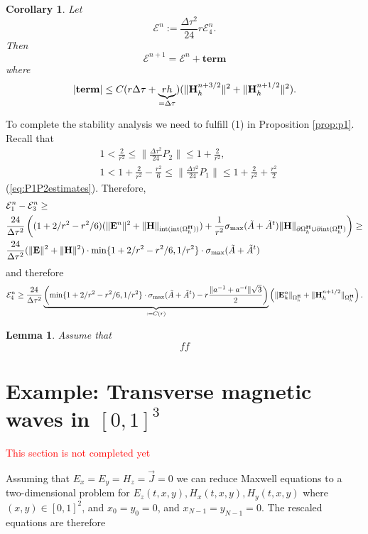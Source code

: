 \documentclass[12pt,reqno]{amsart}
\newcommand{\e}{{\bf E}}
\newcommand{\h}{{\bf H}}
\newtheorem{cor}[theorem]{Corollary}
\newtheorem{lem}[theorem]{Lemma}
\theoremstyle{definition}
\numberwithin{equation}{section}
\newcommand{\intr}[1]{\mathrm{int}(#1)}
\def\Gwh{\Omega_h}
\begin{document}
\begin{cor}
	Let 
	$$
	\mathcal{E}^n:=\frac{\Delta \tau^2}{24}r\mathcal{E}_4^n.
	$$
	Then 
	$$
	\mathcal{E}^{n+1}=	\mathcal{E}^n+\mathbf{term}
	$$
	where 
	$$
	|\mathbf{term}|\leq C(r\Delta \tau  +\underbrace{rh}_{=\Delta \tau})(\| \h_h^{n+3/2}\|^2+\|\h_h^{n+1/2}\|^2).
	$$
\end{cor}
To complete the stability analysis we need to fulfill (1) in Proposition \ref{prop:p1}.
Recall that  
\begin{align}
	&
	1<\frac{2}{r^2}\leq \|\frac{\Delta \tau^2}{24}P_2\|\leq 1+\frac{2}{r^2},\\&
	1<1+\frac{2}{r^2}-\frac{r^2}{6}\leq\|\frac{\Delta \tau^2}{24}P_1\|\leq 1+\frac{2}{r^2}+\frac{r^2}{2}
\end{align} 
(\eqref{eq:P1P2estimates}).
Therefore,
\begin{align*}
	&
	\mathcal{E}_1^n-\mathcal{E}_3^n\geq\\&
	\frac{24}{\Delta \tau^2}\left ((1+2/r^2-r^2/6)(\|\e^n\|^2
	+\|\h\|_{\intr{\intr{\Gwh^\h}}})+\frac{1}{r^2}\sigma_{\max}(\tilde{A}+\tilde{A}^t)
	\|\h\|_{\partial{\Gwh^\h}\cup \partial \intr{\Gwh^\h}}
	\right)\geq \\&
		\frac{24}{\Delta \tau^2}(\|\e\|^2+\|\h\|^2)\cdot 
		\min\{1+2/r^2-r^2/6,1/r^2\}\cdot\sigma_{\max}(\tilde{A}+\tilde{A}^t)
\end{align*}
and therefore
$$
\mathcal{E}_4^n\geq 
\frac{24}{\Delta \tau^2}
\underbrace{
 \left(
	\min\{1+2/r^2-r^2/6,1/r^2\}\cdot\sigma_{\max}(\tilde{A}+\tilde{A}^t)-r\frac{\|a^{-1}+a^{-t}\|\sqrt{3}}{2}
\right)}_{:=C(r)}
\left ( \|\e_h^n\|_{\Gwh^\e}+\|\h_h^{n+1/2}\|_{\Gwh^\h}\right).
$$
\begin{lem}
	Assume that 
	$$
	ff
	$$
\end{lem}










 

	

	\newpage
	\section{Example: Transverse magnetic waves  in $[0,1]^3$}\label{sec:TE}
	\textcolor{red}{This section is not completed yet}
	
	Assuming that $E_x=E_y=H_z=\vec{J}=0$ we can reduce Maxwell equations to a two-dimensional problem for $E_z(t,x,y), H_x(t,x,y), H_y(t,x,y)$ where  $(x,y)\in[0,1]^2$, and
	$x_0=y_0=0$, and $x_{N-1}=y_{N-1}=0$.
	The rescaled equations are therefore 
	
\end{document}
